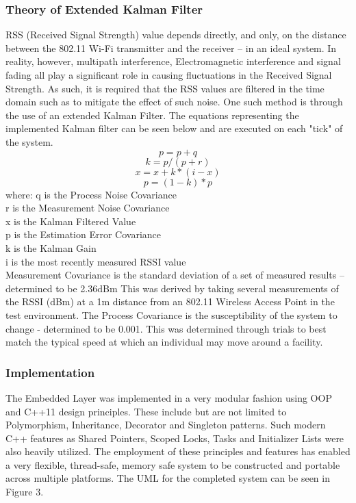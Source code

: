 \documentclass[conference]{IEEEtran}
\begin{document}
\subsubsection{Theory of Extended Kalman Filter}
RSS (Received Signal Strength) value depends directly, and only, on the distance between the 802.11 Wi-Fi transmitter and the receiver – in an ideal system. In reality, however, multipath interference, Electromagnetic interference and signal fading all play a significant role in causing fluctuations in the Received Signal Strength. As such, it is required that the RSS values are filtered in the time domain such as to mitigate the effect of such noise. One such method is through the use of an extended Kalman Filter. The equations representing the implemented Kalman filter can be seen below and are executed on each "tick" of the system.
\begin{equation}
p = p + q
\end{equation}
\begin{equation}
k = p / (p + r)
\end{equation}
\begin{equation}
x = x + k * (i - x)
\end{equation}
\begin{equation}
p = (1 - k) * p
\end{equation}
where:
\newline
q is the Process Noise Covariance \\
r  is the Measurement Noise Covariance \\
x is the Kalman Filtered Value \\
p is the Estimation Error Covariance \\
k is the Kalman Gain \\
i is the most recently measured RSSI value\\

\noindent Measurement Covariance is the standard deviation of a set of measured results – determined to be 2.36dBm This was derived by taking several measurements of the RSSI (dBm) at a 1m distance from an 802.11 Wireless Access Point in the test environment. The Process Covariance is the susceptibility of the system to change - determined to be 0.001. This was determined through trials to best match the typical speed at which an individual may move around a facility.
\newline
\subsubsection{Implementation}
The Embedded Layer was implemented in a very modular fashion using OOP and C++11 design principles. These include but are not limited to Polymorphism, Inheritance, Decorator and Singleton patterns. Such modern C++ features as Shared Pointers, Scoped Locks, Tasks and Initializer Lists were also heavily utilized.
The employment of these principles and features has enabled a very flexible, thread-safe, memory safe system to be constructed and portable across multiple platforms. The UML for the completed system can be seen in Figure 3.
\end{document}

